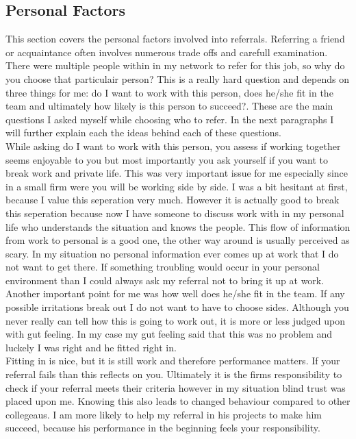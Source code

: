 \documentclass[Main.tex]{subfiles}
\begin{document}
\subsection*{Personal Factors}

This section covers the personal factors involved into referrals. Referring a friend or acquaintance often involves numerous trade offs and carefull examination. \\

There were multiple people within in my network to refer for this job, so why do you choose that particulair person? This is a really hard question and depends  on three things for me: do I want to work with this person, does he/she fit in the team and ultimately how likely is this person to succeed?. These are the main questions I asked myself while choosing who to refer. In the next paragraphs I will further explain each the ideas behind each of these questions.\\

While asking do I want to work with this person, you assess if working together seems enjoyable to you but most importantly you ask yourself if you want to break work and private life. This was very important issue for me especially since in a small firm were you will be working side by side. I was a bit hesitant at first, because I value this seperation very much. However it is actually good to break this seperation because now I have someone to discuss work with in my personal life who understands the situation and knows the people. This flow of information from work to personal is a good one, the other way around is usually perceived as scary. In my situation no personal information ever comes up at work that I do not want to get there. If something troubling would occur in your personal environment than I could always ask my referral not to bring it up at work. \\

Another important point for me was how well does he/she fit in the team. If any possible irritations break out I do not want to have to choose sides. Although you never really can tell how this is going to work out, it is more or less judged upon with gut feeling. In my case my gut feeling said that this was no problem and luckely I was right and he fitted right in.\\

Fitting in is nice, but it is still work and therefore performance matters. If your referral fails than this reflects on you. Ultimately it is the firms responsibility to check if your referral meets their criteria however in my situation blind trust was placed upon me. Knowing this also leads to changed behaviour compared to other collegeaus. I am more likely to help my referral in his projects to make him succeed, because his performance in the beginning feels your responsibility.
\end{document}
